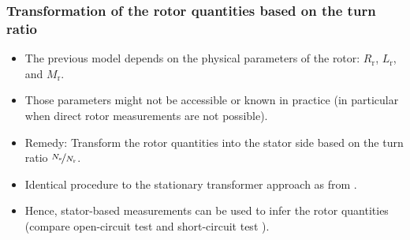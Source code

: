 \begin{frame}
	\frametitle{Transformation of the rotor quantities based on the turn ratio}
    \begin{itemize}
        \item The previous model depends on the physical parameters of the rotor:  $R_\mathrm{r}$, $L_\mathrm{r}$, and $M_\mathrm{r}$.
        \item Those parameters might not be accessible or known in practice (in particular when direct rotor measurements are not possible).
        \item Remedy: Transform the rotor quantities into the stator side based on the turn ratio $\nicefrac{N_\mathrm{s}}{N_\mathrm{r}}$.
        \item Identical procedure to the stationary transformer approach as from . 
        \item Hence, stator-based measurements can be used to infer the rotor quantities (compare open-circuit test  and short-circuit test ).
    \end{itemize}
\end{frame}


